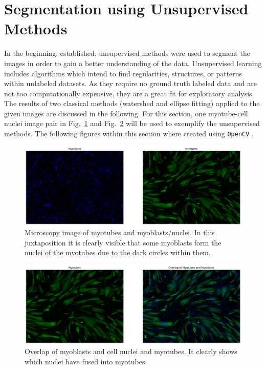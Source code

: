 \section{Segmentation using Unsupervised Methods}\label{secunsupervised}
In the beginning, established, unsupervised methods were used to segment the images in order to gain a better understanding of the data. Unsupervised learning includes algorithms which intend to find regularities, structures, or patterns within unlabeled datasets. As they require no ground truth labeled data and are not too computationally expensive, they are a great fit for exploratory analysis. The results of two classical methods (watershed and ellipse fitting) applied to the given images are discussed in the following. For this section, one myotube-cell nuclei image pair in Fig.~\ref{figtubeblast} and Fig.~\ref{figoverlap} will be used to exemplify the unsupervised methods. The following figures within this section where created using \texttt{OpenCV} \cite{opencv_library}.
\begin{figure}
	\centering
	\includegraphics[width=\textwidth]{"images/workhorse.png"}
	\caption[Workhorse image of myoblasts/cell nuclei and myotubes]{Microscopy image of myotubes and myoblasts/nuclei. In this juxtaposition it is clearly visible that some myoblasts form the nuclei of the myotubes due to the dark circles within them.}
	\label{figtubeblast}
\end{figure}

\begin{figure}
	\centering
	\includegraphics[width=\textwidth]{"images/overlap.png"}
	\caption[Overlap of myoblasts/cell nuclei and myotubes]{Overlap of myoblasts and cell nuclei and myotubes. It clearly shows which nuclei have fused into myotubes.}
	\label{figoverlap}
\end{figure}

